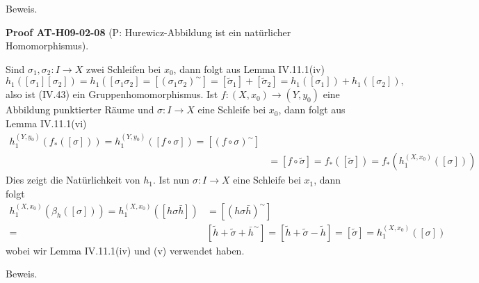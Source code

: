 \documentclass[10pt, letterpaper]{article}
\newcommand{\CustomHeading}[3]{%
  \par\medskip\noindent%
  \textbf{#1 #2} \textnormal{(#3)}.\enskip%
}
\newenvironment{PROOF}[2]{\begin{unitbox}\CustomHeading{Proof}{#1}{#2}}{\end{unitbox}}
\begin{document}
Beweis. 

\begin{PROOF}{AT-H09-02-08}{P: Hurewicz-Abbildung ist ein natürlicher Homomorphismus}
Sind $\sigma_1, \sigma_2: I \rightarrow X$ zwei Schleifen bei $x_0$, dann folgt aus Lemma IV.11.1(iv)
$$
h_1\left(\left[\sigma_1\right]\left[\sigma_2\right]\right)=h_1\left(\left[\sigma_1 \sigma_2\right]=\left[\left(\sigma_1 \sigma_2\right)^{\sim}\right]=\left[\tilde{\sigma}_1\right]+\left[\tilde{\sigma}_2\right]=h_1\left(\left[\sigma_1\right]\right)+h_1\left(\left[\sigma_2\right]\right),\right.
$$
also ist (IV.43) ein Gruppenhomomorphismus. Ist $f:\left(X, x_0\right) \rightarrow\left(Y, y_0\right)$ eine Abbildung punktierter Räume und $\sigma: I \rightarrow X$ eine Schleife bei $x_0$, dann folgt aus Lemma IV.11.1(vi)
$$
\begin{aligned}
h_1^{\left(Y, y_0\right)}\left(f_*([\sigma])\right)=h_1^{\left(Y, y_0\right)}([f \circ \sigma])=\left[(f \circ \sigma)^{\sim}\right] & \\
& =[f \circ \tilde{\sigma}]=f_*([\tilde{\sigma}])=f_*\left(h_1^{\left(X, x_0\right)}([\sigma])\right)
\end{aligned}
$$
Dies zeigt die Natürlichkeit von $h_1$. Ist nun $\sigma: I \rightarrow X$ eine Schleife bei $x_1$, dann folgt
$$
\begin{aligned}
h_1^{\left(X, x_0\right)}\left(\beta_h([\sigma])\right)=h_1^{\left(X, x_0\right)}([h \sigma \bar{h}]) & =\left[(h \sigma \bar{h})^{\sim}\right] \\
= & {\left[\tilde{h}+\tilde{\sigma}+\bar{h}^{\sim}\right]=[\tilde{h}+\tilde{\sigma}-\tilde{h}]=[\tilde{\sigma}]=h_1^{\left(X, x_0\right)}([\sigma]) }
\end{aligned}
$$
wobei wir Lemma IV.11.1(iv) und (v) verwendet haben.
\end{PROOF}


Beweis. 
\end{document}
